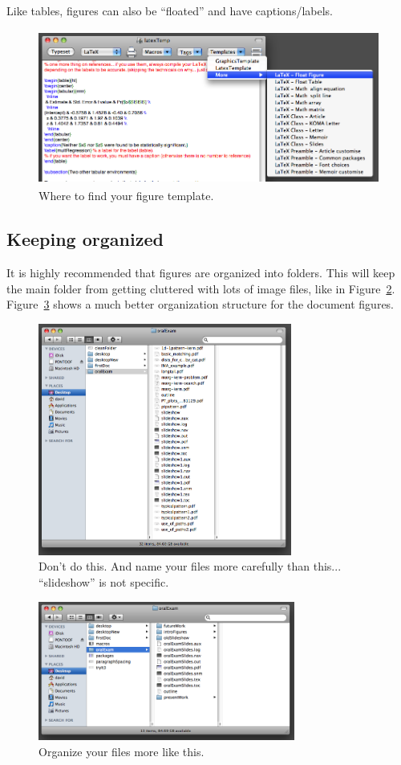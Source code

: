 \documentclass[11pt]{article} %
\begin{document}
Like tables, figures can also be ``floated'' and have captions/labels. \\
\begin{figure}[htbp]
   \centering
   \includegraphics[height=2.0in]{figures/figureTemplate}
   \caption{Where to find your figure template.}
   \label{figureTemplate}
\end{figure}

\subsection{Keeping organized}

It is highly recommended that figures are organized into folders. This will keep the main folder from getting cluttered with lots of image files, like in Figure~\ref{messyFolder}. Figure~\ref{cleanFolder} shows a much better organization structure for the document figures. \\
\begin{figure}[htbp]
   \centering
   \includegraphics[height=3.0in]{figures/messyFolder}
   \caption{Don't do this. And name your files more carefully than this... ``slideshow'' is not specific.}
   \label{messyFolder}
\end{figure}
\begin{figure}[htbp]
   \centering
   \includegraphics[height=1.8in]{figures/cleanFolder}
   \caption{Organize your files more like this.}
   \label{cleanFolder}
\end{figure}
\end{document}
